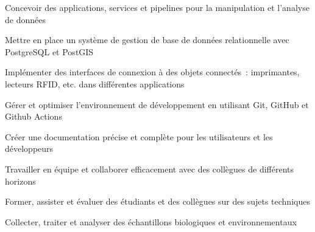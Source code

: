 

\begin{cvskills}

  \begin{minipage}[t]{0.45\textwidth}
    \cvskill
      {Concevoir des applications, services et pipelines pour la manipulation et l’analyse de données}
  \end{minipage}\hfill
  \begin{minipage}[t]{0.45\textwidth}
    \cvskill
      {Mettre en place un système de gestion de base de données relationnelle avec PostgreSQL et PostGIS}
  \end{minipage}

  \begin{minipage}[t]{0.45\textwidth}
    \cvskill
      {Implémenter des interfaces de connexion à des objets connectés : imprimantes, lecteurs RFID, etc. dans différentes applications}
  \end{minipage}\hfill
  \begin{minipage}[t]{0.45\textwidth}
    \cvskill
      {Gérer et optimiser l’environnement de développement en utilisant Git, GitHub et Github Actions}
  \end{minipage}

  \begin{minipage}[t]{0.45\textwidth}
    \cvskill
      {Créer une documentation précise et complète pour les utilisateurs et les développeurs}
  \end{minipage}\hfill
  \begin{minipage}[t]{0.45\textwidth}
    \cvskill
      {Travailler en équipe et collaborer efficacement avec des collègues de différents horizons}
  \end{minipage}

  \begin{minipage}[t]{0.45\textwidth}
    \cvskill
      {Former, assister et évaluer des étudiants et des collègues sur des sujets techniques}
  \end{minipage}\hfill
  \begin{minipage}[t]{0.45\textwidth}
    \cvskill
      {Collecter, traiter et analyser des échantillons biologiques et environnementaux}
  \end{minipage}

\end{cvskills}